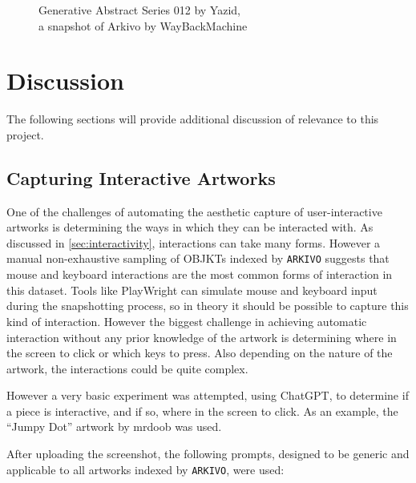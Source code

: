 \begin{figure}[h]
    \centering
    \captionsetup{justification=centering}
    \begingroup
    \setlength{\fboxsep}{0pt} %
    \setlength{\fboxrule}{1pt} %
    \endgroup
    \caption[WayBackMachine snapshots Arkivo]{Generative Abstract Series 012 by Yazid, \\ a snapshot of Arkivo by WayBackMachine}
    \label{fig:awayback-arkivo}
\end{figure}


\section{Discussion}

The following sections will provide additional discussion of relevance to this project.

\subsection{Capturing Interactive Artworks}
\label{subsec:capture-interactive}

One of the challenges of automating the aesthetic capture of user-interactive artworks is determining the ways in which they can be interacted with. As discussed in \autoref{sec:interactivity}, interactions can take many forms. However a manual non-exhaustive sampling of OBJKTs indexed by \texttt{ARKIVO} suggests that mouse and keyboard interactions are the most common forms of interaction in this dataset. Tools like PlayWright can simulate mouse and keyboard input during the snapshotting process, so in theory it should be possible to capture this kind of interaction. However the biggest challenge in achieving automatic interaction without any prior knowledge of the artwork is determining where in the screen to click or which keys to press. Also depending on the nature of the artwork, the interactions could be quite complex.

However a very basic experiment was attempted, using ChatGPT, to determine if a piece is interactive, and if so, where in the screen to click. As an example, the ``Jumpy Dot'' artwork by mrdoob was used.

After uploading the screenshot, the following prompts, designed to be generic and applicable to all artworks indexed by \texttt{ARKIVO}, were used:

